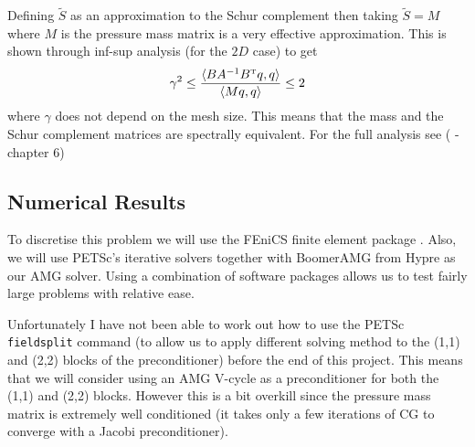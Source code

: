 \documentclass[11pt]{article}
\numberwithin{equation}{section}    %
\begin{document}
Defining $\tilde S$ as an approximation to the Schur complement then taking $\tilde S = M$ where $M$ is the pressure mass matrix is a very effective approximation. This is shown through inf-sup analysis (for the $2D$ case) to get
\begin{equation}
    \gamma^2 \leq \frac{\langle BA^{-1}B^{\mbox{\tiny{T}}}q,q\rangle}{\langle Mq,q \rangle} \leq 2
\end{equation}
where $\gamma$ does not depend on the mesh size. This means that the mass and the Schur complement matrices are spectrally equivalent. For the full analysis see (\cite{Elman2005} - chapter 6)


\subsection{Numerical Results} \label{sec:results}

To discretise this problem we will use the FEniCS finite element package \cite{logg2012automated}. Also, we will use PETSc's \cite{petsc-web-page} iterative solvers together with BoomerAMG \cite{henson2002boomeramg} from Hypre as our AMG solver. Using a combination of software packages allows us to test fairly large problems with relative ease.

Unfortunately I have not been able to work out how to use the PETSc {\tt{fieldsplit}} command (to allow us to apply different solving method to the (1,1) and (2,2) blocks of the preconditioner) before the end of this project. This means that we will consider using an AMG  V-cycle as a preconditioner for both the (1,1) and (2,2) blocks. However this is a bit overkill since the pressure mass matrix is extremely well conditioned (it takes only a few iterations of CG to converge with a Jacobi preconditioner).
\end{document}
